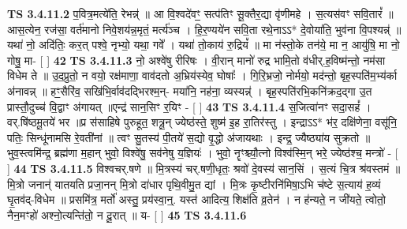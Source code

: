 \documentclass[17pt]{extarticle}
\begin{document}
                  \newline
                                \textbf{ TS 3.4.11.2} \newline
                  प॒वित्र॒मत्ये॑ति॒ रेभन्न्॑ ॥ आ वि॒श्वदे॑वꣳ॒॒ सत्प॑तिꣳ सू॒क्तैर॒द्या वृ॑णीमहे । स॒त्यस॑वꣳ सवि॒तारं᳚ ॥ आस॒त्येन॒ रज॑सा॒ वर्त॑मानो निवे॒शय॑न्न॒मृतं॒ मर्त्य॑ञ्च । हि॒र॒ण्यये॑न सवि॒ता रथे॒नाऽऽ* दे॒वोया॑ति॒ भुव॑ना वि॒पश्यन्न्॑ ॥ यथा॑ नो॒ अदि॑तिः॒ कर॒त् पश्वे॒ नृभ्यो॒ यथा॒ गवे᳚ । यथा॑ तो॒काय॑ रु॒द्रियं᳚ ॥ मा न॑स्तो॒के तन॑ये॒ मा न॒ आयु॑षि॒ मा नो॒ गोषु॒ मा- [  ] \textbf{  42} \newline
                  \newline
                                \textbf{ TS 3.4.11.3} \newline
                  नो॒ अश्वे॑षु रीरिषः । वी॒रान् मानो॑ रुद्र भामि॒तो व॑धीर्.ह॒विष्म॑न्तो॒ नम॑सा विधेम ते ॥ उ॒द॒प्रुतो॒ न वयो॒ रक्ष॑माणा॒ वाव॑दतो अ॒भ्रिय॑स्येव॒ घोषाः᳚ । गि॒रि॒भ्रजो॒ नोर्मयो॒ मद॑न्तो॒ बृह॒स्पति॑म॒भ्य॑र्का अ॑नावन्न् ॥ हꣳ॒॒सैरि॑व॒ सखि॑भि॒र्वाव॑दद्भिरश्म॒न्- मया॑नि॒ नह॑ना॒ व्यस्यन्न्॑ । बृह॒स्पति॑रभि॒कनि॑क्रद॒द्गा उ॒त प्रास्तौ॒दुच्च॑ वि॒द्वाꣳ अ॑गायत् ॥एन्द्र॑ सान॒सिꣳ र॒यिꣳ - [  ] \textbf{  43} \newline
                  \newline
                                \textbf{ TS 3.4.11.4} \newline
                  स॒जित्वा॑नꣳ सदा॒सहं᳚ । वर्.षि॑ष्ठमू॒तये॑ भर ॥प्र स॑साहिषे पुरुहूत॒ शत्रू॒न् ज्येष्ठ॑स्ते॒ शुष्म॑ इ॒ह रा॒तिर॑स्तु । इन्द्राऽऽ* भ॑र॒ दक्षि॑णेना॒ वसू॑नि॒ पतिः॒ सिन्धू॑नामसि रे॒वती॑नां ॥ त्वꣳ सु॒तस्य॑ पी॒तये॑ स॒द्यो वृ॒द्धो अ॑जायथाः । इन्द्र॒ ज्यैष्ठ्या॑य सुक्रतो ॥ भुव॒स्त्वमि॑न्द्र॒ ब्रह्म॑णा म॒हान् भुवो॒ विश्वे॑षु॒ सव॑नेषु य॒ज्ञियः॑ । भुवो॒ नॄꣳश्च्यौ॒त्नो विश्व॑स्मि॒न् भरे॒ ज्येष्ठ॑श्च॒ मन्त्रो॑ - [  ] \textbf{  44} \newline
                  \newline
                                \textbf{ TS 3.4.11.5} \newline
                  विश्वचर्.षणे ॥ मि॒त्रस्य॑ चर्.षणी॒धृतः॒ श्रवो॑ दे॒वस्य॑ सान॒सिं । स॒त्यं चि॒त्र श्र॑वस्तमं ॥मि॒त्रो जनान्॑ यातयति प्रजा॒नन् मि॒त्रो दा॑धार पृथि॒वीमु॒त द्यां । मि॒त्रः कृ॒ष्टीरनि॑मिषा॒ऽभि च॑ष्टे स॒त्याय॑ ह॒व्यं घृ॒तव॑द्-विधेम ॥ प्रसमि॑त्र॒ मर्तो॑ अस्तु॒ प्रय॑स्वा॒न्॒. यस्त॑ आदित्य॒ शिक्ष॑ति व्र॒तेन॑ । न ह॑न्यते॒ न जी॑यते॒ त्वोतो॒ नैन॒मꣳहो॑ अश्नो॒त्यन्ति॑तो॒ न दू॒रात् ॥ य- [  ] \textbf{  45} \newline
                  \newline
                                \textbf{ TS 3.4.11.6} \newline
\end{document}

